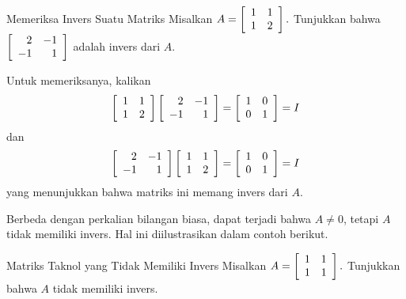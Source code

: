 \begin{example}{Memeriksa Invers Suatu Matriks}\label{exa:verifyinginverse}
Misalkan $A=\left[
\begin{array}{rr}
1 & 1 \\
1 & 2
\end{array}
\right] .$ Tunjukkan bahwa $\left[
\begin{array}{rr}
2 & -1 \\
-1 & 1
\end{array}
\right] $ adalah invers dari $A.$
\end{example}

\begin{solution} Untuk memeriksanya, kalikan
\begin{equation*}
\left[
\begin{array}{rr}
1 & 1 \\
1 & 2
\end{array}
\right] \left[
\begin{array}{rr}
2 & -1 \\
-1 & 1
\end{array}
\right] =\allowbreak \left[
\begin{array}{rr}
1 & 0 \\
0 & 1
\end{array}
\right] = I 
\end{equation*}
dan
\begin{equation*}
\left[
\begin{array}{rr}
2 & -1 \\
-1 & 1
\end{array}
\right] \left[
\begin{array}{rr}
1 & 1 \\
1 & 2
\end{array}
\right] =\allowbreak \left[
\begin{array}{rr}
1 & 0 \\
0 & 1
\end{array}
\right] = I 
\end{equation*}
yang menunjukkan bahwa matriks ini memang invers dari $A.$
\end{solution}

Berbeda dengan perkalian bilangan biasa, dapat terjadi bahwa $A\neq 0$, tetapi
$A$ tidak memiliki invers. Hal ini diilustrasikan dalam contoh berikut.

\begin{example}{Matriks Taknol yang Tidak Memiliki Invers}\label{exa:noninvertiblematrix}
Misalkan $A=\left[
\begin{array}{rr}
1 & 1 \\
1 & 1
\end{array}
\right] .$ Tunjukkan bahwa $A$ tidak memiliki invers.
\end{example}

